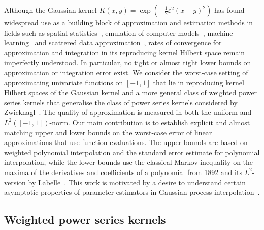 \documentclass{mcom-l}
\numberwithin{equation}{section}
\numberwithin{theorem}{section} %
\begin{document}
Although the Gaussian kernel $K(x, y) = \exp(-\frac{1}{2} \varepsilon^2(x - y)^2)$ has found widespread use as a building block of approximation and estimation methods in fields such as spatial statistics~\cite{Stein1999}, emulation of computer models~\cite{Sacks1989}, machine learning~\cite{RasmussenWilliams2006} and scattered data approximation~\cite{Wendland2005}, rates of convergence for approximation and integration in its reproducing kernel Hilbert space remain imperfectly understood.
In particular, no tight or almost tight lower bounds on approximation or integration error exist.
We consider the worst-case setting of approximating univariate functions on $[-1, 1]$ that lie in reproducing kernel Hilbert spaces of the Gaussian kernel and a more general class of weighted power series kernels that generalise the class of power series kernels considered by Zwicknagl~\cite{Zwicknagl2009}.
The quality of approximation is measured in both the uniform and $L^2([-1, 1])$-norm.
Our main contribution is to establish explicit and almost matching upper and lower bounds on the worst-case error of linear approximations that use function evaluations.
The upper bounds are based on weighted polynomial interpolation and the standard error estimate for polynomial interpolation, while the lower bounds use the classical Markov inequality on the maxima of the derivatives and coefficients of a polynomial from 1892 and its $L^2$-version by Labelle~\cite{Labelle1969}.
This work is motivated by a desire to understand certain asymptotic properties of parameter estimators in Gaussian process interpolation~\cite{Karvonen2022-smoothness}.

\subsection{Weighted power series kernels} \label{sec:intro-kernels}
\end{document}
